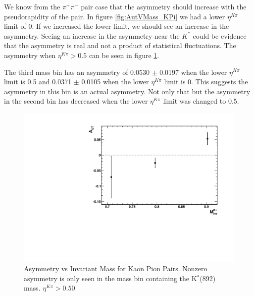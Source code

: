 \documentclass[abstract = on,listof=totoc, bibliography=totoc]{scrreprt}
\newcommand{\pip}{\pi^+}
\newcommand{\pim}{\pi^-}
\newcommand{\pair}{$\pip\pim$ }
\newcommand{\etakp}{\eta^{K\pi}}
\begin{document}
We know from the \pair pair case that the asymmetry should increase with the pseudorapidity of the pair. In figure \ref{fig:AutVMass_KPi} we had a lower $\etakp$ limit of 0. If we increased the lower limit, we should see an increase in the asymmetry. Seeing an increase in the asymmetry near the $K^*$ could be evidence that the asymmetry is real and not a product of statistical fluctuations. The asymmetry when $\etakp > 0.5$ can be seen in figure \ref{fig:AutVMass_KPi_eta050}. 

The third mass bin has an asymmetry of 0.0530 $\pm$ 0.0197 when the lower $\etakp$ limit is 0.5 and 0.0371 $\pm$ 0.0105 when the lower $\etakp$ limit is 0. This suggests the asymmetry in this bin is an actual asymmetry. Not only that but the asymmetry in the second bin has decreased when the lower $\etakp$ limit was changed to 0.5. 

\begin{figure}
\begin{center}
\includegraphics[width = .6\textwidth]{AsymVsM_eta050}
\caption[Asymmetry vs Invariant Mass for Kaon Pion Pairs]{Asymmetry vs Invariant Mass for Kaon Pion Pairs. Nonzero asymmetry is only seen in the mass bin containing the K$^*$(892) mass. $\etakp > 0.50$}
\label{fig:AutVMass_KPi_eta050}
\end{center}
\end{figure}
\end{document}
